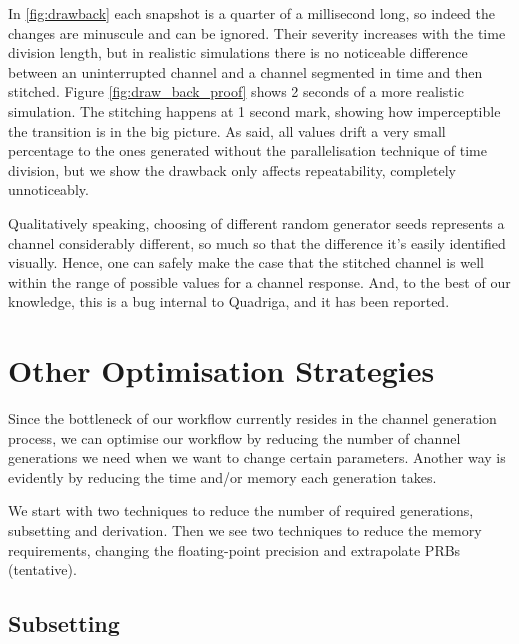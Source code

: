 

In \ref{fig:drawback} each snapshot is a quarter of a millisecond long, so indeed the changes are minuscule and can be ignored. Their severity increases with the time division length, but in realistic simulations there is no noticeable difference between an uninterrupted channel and a channel segmented in time and then stitched. Figure \ref{fig:draw_back_proof} shows 2 seconds of a more realistic simulation. The stitching happens at 1 second mark, showing how imperceptible the transition is in the big picture. As said, all values drift a very small percentage to the ones generated without the parallelisation technique of time division, but we show the drawback only affects repeatability, completely unnoticeably.



Qualitatively speaking, choosing of different random generator seeds represents a channel considerably different, so much so that the difference it's easily identified visually. Hence, one can safely make the case that the stitched channel is well within the range of possible values for a channel response. And, to the best of our knowledge, this is a bug internal to Quadriga, and it has been reported.

\section{Other Optimisation Strategies} \label{optimisation_strats}

Since the bottleneck of our workflow currently resides in the channel generation process, we can optimise our workflow by reducing the number of channel generations we need when we want to change certain parameters. Another way is evidently by reducing the time and/or memory each generation takes.

We start with two techniques to reduce the number of required generations, subsetting and derivation. Then we see two techniques to reduce the memory requirements, changing the floating-point precision and extrapolate PRBs (tentative).

\subsection*{Subsetting}

